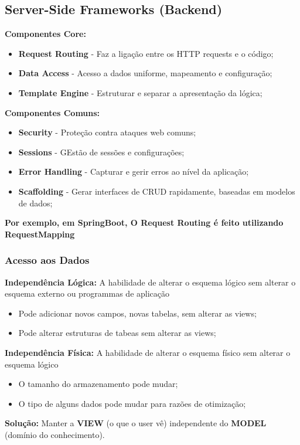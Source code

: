 \documentclass{article}
\begin{document}
\subsection{Server-Side Frameworks (Backend)}

\begin{flushleft}
  \textbf{Componentes Core:}
  \begin{itemize}
    \item \textbf{Request Routing} - Faz a ligação entre os HTTP requests e o código;
    \item \textbf{Data Access} - Acesso a dados uniforme, mapeamento e configuração;
    \item \textbf{Template Engine} - Estruturar e separar a apresentação da lógica; 
  \end{itemize}

  \textbf{Componentes Comuns:}
  \begin{itemize}
    \item \textbf{Security} - Proteção contra ataques web comuns;
    \item \textbf{Sessions} - GEstão de sessões e configurações;
    \item \textbf{Error Handling} - Capturar e gerir erros ao nível da aplicação;
    \item \textbf{Scaffolding} - Gerar interfaces de CRUD rapidamente, baseadas em
    modelos de dados;
  \end{itemize}

  \textbf{Por exemplo, em SpringBoot, O Request Routing é feito utilizando
  RequestMapping}
\end{flushleft}

\subsubsection{Acesso aos Dados}

\begin{flushleft}
  \textbf{Independência Lógica:} A habilidade de alterar o esquema lógico sem
  alterar o esquema externo ou programmas de aplicação
  \begin{itemize}
    \item Pode adicionar novos campos, novas tabelas, sem alterar as views;
    \item Pode alterar estruturas de tabeas sem alterar as views;
  \end{itemize}

  \textbf{Independência Física:} A habilidade de alterar o esquema físico
  sem alterar o esquema lógico
  \begin{itemize}
    \item O tamanho do armazenamento pode mudar;
    \item O tipo de alguns dados pode mudar para razões de otimização;
  \end{itemize}

  \textbf{Solução:} Manter a \textbf{VIEW} (o que o user vê) independente do
  \textbf{MODEL} (domínio do conhecimento).
\end{flushleft}
\end{document}
